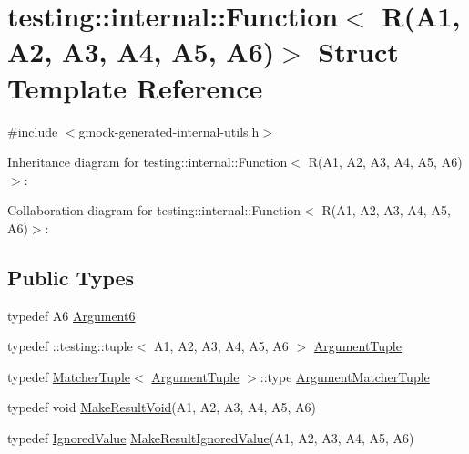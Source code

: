 \hypertarget{structtesting_1_1internal_1_1_function_3_01_r_07_a1_00_01_a2_00_01_a3_00_01_a4_00_01_a5_00_01_a6_08_4}{}\section{testing\+:\+:internal\+:\+:Function$<$ R(A1, A2, A3, A4, A5, A6)$>$ Struct Template Reference}
\label{structtesting_1_1internal_1_1_function_3_01_r_07_a1_00_01_a2_00_01_a3_00_01_a4_00_01_a5_00_01_a6_08_4}


{\ttfamily \#include $<$gmock-\/generated-\/internal-\/utils.\+h$>$}



Inheritance diagram for testing\+:\+:internal\+:\+:Function$<$ R(A1, A2, A3, A4, A5, A6)$>$\+:


Collaboration diagram for testing\+:\+:internal\+:\+:Function$<$ R(A1, A2, A3, A4, A5, A6)$>$\+:
\subsection*{Public Types}
\begin{DoxyCompactItemize}
\item 
typedef A6 \hyperlink{structtesting_1_1internal_1_1_function_3_01_r_07_a1_00_01_a2_00_01_a3_00_01_a4_00_01_a5_00_01_a6_08_4_ab69a06609b76f3b0ef780b9ecf0a940c}{Argument6}
\item 
typedef \+::testing\+::tuple$<$ A1, A2, A3, A4, A5, A6 $>$ \hyperlink{structtesting_1_1internal_1_1_function_3_01_r_07_a1_00_01_a2_00_01_a3_00_01_a4_00_01_a5_00_01_a6_08_4_a3120b03652156e1475ce5892e1b5dd7a}{Argument\+Tuple}
\item 
typedef \hyperlink{structtesting_1_1internal_1_1_matcher_tuple}{Matcher\+Tuple}$<$ \hyperlink{structtesting_1_1internal_1_1_function_3_01_r_07_08_4_ad483c3128c470d8cdb55c3ac1c575c11}{Argument\+Tuple} $>$\+::type \hyperlink{structtesting_1_1internal_1_1_function_3_01_r_07_a1_00_01_a2_00_01_a3_00_01_a4_00_01_a5_00_01_a6_08_4_a8555cb8e68c1e64b91b6c50a7b5951bd}{Argument\+Matcher\+Tuple}
\item 
typedef void \hyperlink{structtesting_1_1internal_1_1_function_3_01_r_07_a1_00_01_a2_00_01_a3_00_01_a4_00_01_a5_00_01_a6_08_4_aa60c44ec945ca78297aaf7a3c785bce5}{Make\+Result\+Void}(A1, A2, A3, A4, A5, A6)
\item 
typedef \hyperlink{classtesting_1_1internal_1_1_ignored_value}{Ignored\+Value} \hyperlink{structtesting_1_1internal_1_1_function_3_01_r_07_a1_00_01_a2_00_01_a3_00_01_a4_00_01_a5_00_01_a6_08_4_a20c49ac827433a288921ca0caa0d319b}{Make\+Result\+Ignored\+Value}(A1, A2, A3, A4, A5, A6)
\end{DoxyCompactItemize}


